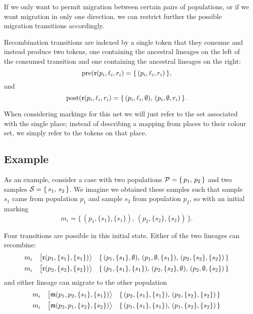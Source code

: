 If we only want to permit migration between certain pairs of populations, or if we want migration in only one direction, we can restrict further the possible migration transitions accordingly.

Recombination transitions are indexed by a single token that they consume and instead produce two tokens, one containing the ancestral lineages on the left of the consumed transition and one containing the ancestral lineages on the right:
\[
    \operatorname{pre}(\mathfrak{r}(p_i,\ell_i,r_i) =
    \{\,(p_i,\ell_i,r_i)\,\},
\]
and
\[
    \operatorname{post}(\mathfrak{r}(p_i,\ell_i,r_i) =
    \{\,(p_i,\ell_i,\emptyset),\,(p_i,\emptyset,r_i)\,\}
    .
\]

When considering markings for this net we will just refer to the set associated with the single place; instead of describing a mapping from places to their colour set, we simply refer to the tokens on that place.

\subsection{Example}

As an example, consider a case with two populations $\mathcal{P}=\{\,p_1,\,p_2\,\}$ and two samples $\mathcal{S}=\{\,s_1,\,s_2\,\}$. We imagine we obtained these samples such that sample $s_1$ came from population $p_1$ and sample $s_2$ from population $p_2$, so with an initial marking 
\[
    m_\iota = \{\,(p_1,\{s_1\},\{s_1\}),\,(p_2,\{s_2\},\{s_2\})\,\}
    .
\]

Four transitions are possible in this initial state. Either of the two lineages can recombine:
\begin{eqnarray}
    \label{eq:recomb_transition_1}
    m_\iota
    \quad \big[\mathfrak{r}(p_1,\{s_1\},\{s_1\})\big\rangle \quad
    \{\,(p_1,\{s_1\},\emptyset),\,
        (p_1,\emptyset,\{s_1\}),\,
        (p_2,\{s_2\},\{s_2\})\,\}\\
    \label{eq:recomb_transition_2}
    m_\iota
    \quad \big[\mathfrak{r}(p_2,\{s_2\},\{s_2\})\big\rangle \quad
    \{\,(p_1,\{s_1\},\{s_1\}),\,
        (p_2,\{s_2\},\emptyset),\,
        (p_2,\emptyset,\{s_2\})\,\}
\end{eqnarray}
and either lineage can migrate to the other population
\begin{eqnarray}
    \label{eq:migration_transition_12}
    m_\iota
    \quad \big[\mathfrak{m}(p_1,p_2,\{s_1\},\{s_1\})\big\rangle \quad
    \{\,(p_2,\{s_1\},\{s_1\}),\,(p_2,\{s_2\},\{s_2\})\,\}\\
    \label{eq:migration_transition_21}
    m_\iota
    \quad \big[\mathfrak{m}(p_2,p_1,\{s_2\},\{s_2\})\big\rangle \quad
    \{\,(p_1,\{s_1\},\{s_1\}),\,(p_1,\{s_2\},\{s_2\})\,\}
\end{eqnarray}

